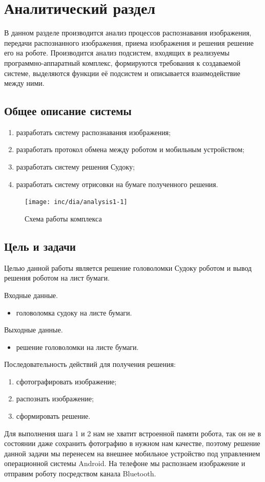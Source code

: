\chapter{Аналитический раздел}
\label{cha:analysis}
%
%
В данном разделе производится анализ процессов распознавания изображения, передачи распознанного изображения, приема изображения и  решения решение его на роботе.
Производится анализ подсистем, входящих в реализуемы программно-аппаратный комплекс, формируются требования к создаваемой системе, выделяются функции её подсистем и описывается взаимодействие между ними.

\section{Общее описание системы}

\begin{enumerate}
\item разработать систему распознавания изображения;
\item разработать протокол обмена между роботом и мобильным устройством;
\item разработать систему решения Судоку;
\item разработать систему отрисовки на бумаге полученного решения.
\end{enumerate}

\begin{figure}
  \centering
  \texttt{[image: inc/dia/analysis1-1]}
  \caption{Схема работы комплекса}
  \label{fig:fig05}
\end{figure}

\section{Цель и задачи}
Целью данной работы является решение головоломки Судоку роботом и вывод решения роботом на лист бумаги.


Входные данные.
\begin{itemize}
\item головоломка судоку на листе бумаги.
\end{itemize}

Выходные данные.
\begin{itemize}
\item решение головоломки на листе бумаги.
\end{itemize}

Последовательность действий для  получения решения:
\begin{enumerate}
\item сфотографировать изображение;
\item распознать изображение;
\item сформировать решение.
\end{enumerate}
Для выполнения шага 1 и 2 нам не хватит встроенной памяти робота, так он не в состоянии даже сохранить фотографию в нужном нам качестве, поэтому решение данной задачи мы перенесем на внешнее мобильное устройство под управлением операционной системы Android. На телефоне мы распознаем изображение и отправим роботу посредством канала Bluetooth.

